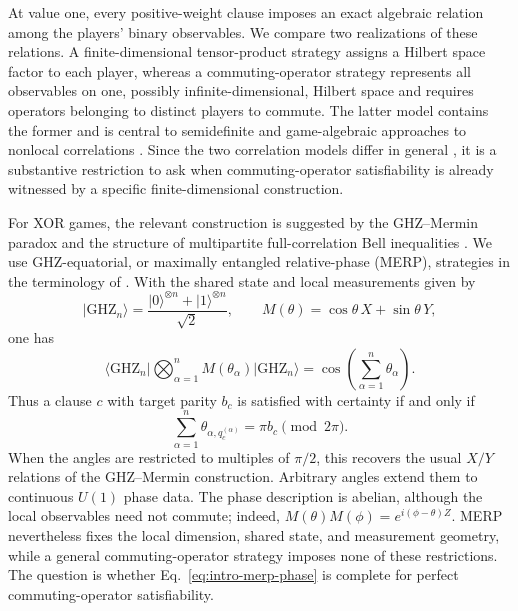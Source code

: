 \documentclass[11pt]{article}
\theoremstyle{definition}
\theoremstyle{remark}
\numberwithin{equation}{section}
\begin{document}
At value one, every positive-weight clause imposes an exact algebraic relation among
the players' binary observables.  We compare two realizations of these
relations.  A finite-dimensional tensor-product strategy assigns a Hilbert
space factor to each player, whereas a commuting-operator strategy represents
all observables on one, possibly infinite-dimensional, Hilbert space and
requires operators belonging to distinct players to commute.  The latter
model contains the former and is central to semidefinite and game-algebraic
approaches to nonlocal correlations
\cite{NavascuesPironioAcin2008,CleveLiuSlofstra2017}.  Since the two correlation
models differ in general \cite{Slofstra2019,JiNatarajanVidickWrightYuen2020}, it
is a substantive restriction to ask when commuting-operator satisfiability is
already witnessed by a specific finite-dimensional construction.

For XOR games, the relevant construction is suggested by the GHZ--Mermin
paradox and the structure of multipartite full-correlation Bell inequalities
\cite{GreenbergerHorneShimonyZeilinger1990,Mermin1990,WernerWolf2001}.  We use
GHZ-equatorial, or maximally entangled relative-phase (MERP), strategies in the
terminology of \cite{WattsHarrowKanwarNatarajan2019}.  With the shared state and local measurements given by
\[
  \lvert\mathrm{GHZ}_n\rangle
  =\frac{\lvert0\rangle^{\otimes n}+\lvert1\rangle^{\otimes n}}{\sqrt2},
  \qquad
  M(\theta)=\cos\theta\,X+\sin\theta\,Y,
\]
one has
\begin{equation}\label{eq:intro-ghz-correlator}
  \bigl\langle\mathrm{GHZ}_n\bigr\rvert
  \bigotimes_{\alpha=1}^{n}M(\theta_\alpha)
  \bigl\lvert\mathrm{GHZ}_n\bigr\rangle
  =\cos\!\left(\sum_{\alpha=1}^{n}\theta_\alpha\right).
\end{equation}
Thus a clause \(c\) with target parity \(b_c\) is satisfied with certainty if
and only if
\begin{equation}\label{eq:intro-merp-phase}
  \sum_{\alpha=1}^{n}\theta_{\alpha,q_c^{(\alpha)}}
  =\pi b_c\pmod{2\pi}.
\end{equation}
When the angles are restricted to multiples of \(\pi/2\),
this recovers the usual \(X/Y\) relations of the GHZ--Mermin construction.
Arbitrary angles extend them to continuous \(U(1)\) phase data.  The phase
description is abelian, although the local observables need not commute;
indeed, $M(\theta)M(\phi)=e^{i(\phi-\theta)Z}.$ MERP nevertheless fixes the local dimension, shared state, and measurement
geometry, while a general commuting-operator strategy imposes none of these
restrictions.
The question is whether Eq.~\eqref{eq:intro-merp-phase} is complete for perfect
commuting-operator satisfiability.
\end{document}
